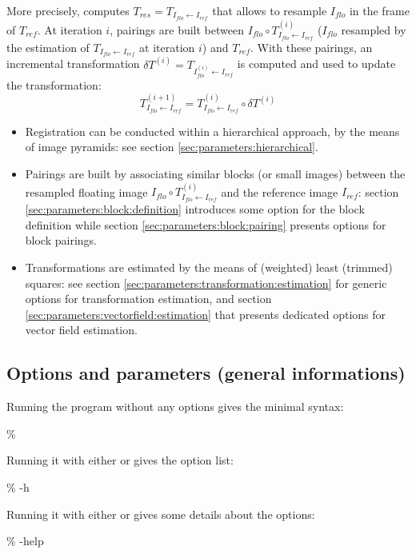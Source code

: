 More precisely, \blockmatching computes $T_{res} = T_{I_{flo} \leftarrow I_{ref}}$ that allows to resample $I_{flo}$ in the frame of $T_{ref}$.
At iteration $i$, pairings are built between $I_{flo} \circ T^{(i)}_{I_{flo} \leftarrow I_{ref}}$ ($I_{flo}$ resampled by the estimation of $T_{I_{flo} \leftarrow I_{ref}}$ at iteration $i$) and $T_{ref}$. With these pairings, an incremental transformation $\delta T^{(i)} = T_{I^{(i)}_{flo} \leftarrow I_{ref}}$ is computed and used to update the transformation:
\begin{displaymath}
T^{(i+1)}_{I_{flo} \leftarrow I_{ref}} 
= T^{(i)}_{I_{flo} \leftarrow I_{ref}} \circ \delta T^{(i)}
\end{displaymath}

\begin{itemize}

\item Registration can be conducted within a hierarchical approach, by the means of image pyramids: see section \ref{sec:parameters:hierarchical}.

\item Pairings are built by associating similar blocks (or small images) between the resampled floating image $I_{flo} \circ T^{(i)}_{I_{flo} \leftarrow I_{ref}}$ and the reference image $I_{ref}$: section \ref{sec:parameters:block:definition} introduces some option for the block definition while section \ref{sec:parameters:block:pairing} presents options for block pairings.

\item Transformations are estimated by the means of (weighted) least (trimmed) squares: see section \ref{sec:parameters:transformation:estimation} for generic options for transformation estimation, and section \ref{sec:parameters:vectorfield:estimation} that presents dedicated options for vector field estimation.

\end{itemize}






\subsection{Options and parameters (general informations)}


Running the program without any options gives the minimal syntax:
\begin{code}{1}
\% \blockmatching 
\end{code}
Running it with either  or  gives the option list:
\begin{code}{1}
\% \blockmatching -h
\end{code}
Running it with either  or  gives some details about the options:
\begin{code}{1}
\% \blockmatching -help
\end{code}

